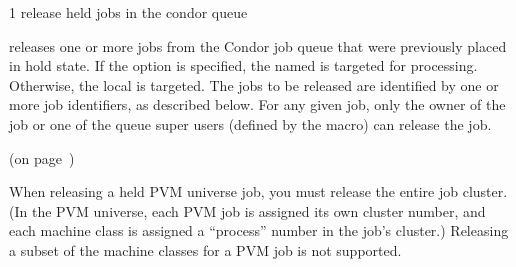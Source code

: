 \begin{ManPage}{\label{man-condor-release}}{1}
{release held jobs in the condor queue}
\Synopsis {}
\ToolArgs
{}


\Description

 releases one or more jobs from the Condor job queue that were 
previously placed in hold state.  
If the  option is specified, the named  is targeted
for processing.  
Otherwise, the local  is targeted.
The jobs to be released are identified by one or more job identifiers, as
described below.
For any given job, only the owner of the job or one of the queue super users
(defined by the  macro) can release the job.

\begin{Options}
	\ToolArgsDesc
\end{Options}

\SeeAlso
{} (on page~\pageref{man-condor-hold})

\GenRem

When releasing a held PVM universe job, you must release the entire
job cluster.  (In the PVM universe, each PVM job is assigned its own
cluster number, and each machine class is assigned a ``process''
number in the job's cluster.)  Releasing a subset of the machine
classes for a PVM job is not supported.

\end{ManPage}
